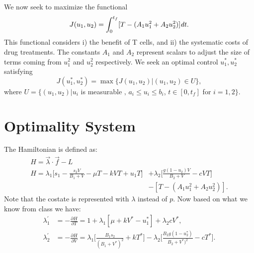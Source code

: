 We now seek to maximize the functional 
\[
J(u_1,u_2) = \int_0^{t_f}[T-(A_1u_1^2+A_2u_2^2)]\it{dt}.
\]
This functional considers i) the benefit of T cells, and ii) the systematic costs of drug treatments.
The constants $A_1$ and $A_2$ represent scalars to adjust the size of terms coming from $u_1^2$ and $u_2^2$ respectively. 
We seek an optimal control $u_1^*,u_2^*$ satisfying
\[
J(u_1^*,u_2^*)=\max\{J(u_1,u_2)|(u_1,u_2)\in U\},
\]
where $U=\{(u_1,u_2)|u_i $ is measurable $,\,a_i\le u_i \le b_i$, $t\in[0,t_f]$ for $i=1,2\}$.
 
\section*{Optimality System}
The Hamiltonian is defined as:
\begin{align*}
	H = \vec{\lambda} \cdot \vec{f} - L\\
	H =\lambda_1\Big[ s_1 - \frac{s_2V}{B_1+V}-\mu T-kVT+u_1T \Big] &+ \lambda_2 \Big[\frac{g(1-u_2)V}{B_2+V}-cVT\Big]\\
	 &-  [T-(A_1u_1^2+A_2u_2^2)].
\end{align*}
Note that the costate is represented with $\lambda$ instead of $p$. Now based on what we know from class we have:
\begin{align*}
	\lambda_1^{'} &=-\frac{\partial H}{\partial T} =  1+\lambda_1[\mu+kV^*-u_1^*]+\lambda_2cV^*,\\
	\lambda_2^{'} &= -\frac{\partial H}{\partial V} = \lambda_1\Big[\frac{B_1s_2}{(B_1+V^*)^2}+kT^*\Big] -\lambda_2\Big[\frac{B_2g(1-u_2^*)}				{B_2+V^*)^2}-cT^*\Big].
\end{align*}

